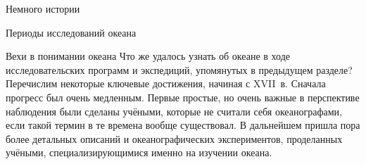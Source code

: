 \begin{chapter}{Немного истории}
\begin{section}{Периоды исследований океана}
\end{section}

\begin{section}{Вехи в понимании океана}
Что же удалось узнать об океане в ходе исследовательских программ и
экспедиций, упомянутых в предыдущем разделе? Перечислим некоторые ключевые
достижения, начиная с XVII~в. Сначала прогресс
был очень медленным. Первые простые, но очень важные в перспективе
наблюдения были сделаны учёными, которые не считали себя океанографами, 
если такой термин в те времена вообще существовал. 
В дальнейшем пришла пора более детальных описаний и океанографических 
экспериментов, проделанных учёными, специализирующимися
именно на изучении океана. 
%






\end{section}
\end{chapter}

